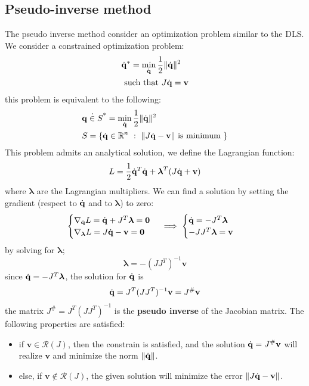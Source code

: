 \documentclass[10pt, letterpaper]{report}
\begin{document}
\subsection{Pseudo-inverse method}
The pseudo inverse method consider an optimization problem similar to the DLS. We consider a constrained optimization problem:\begin{align}
    &\dot{\mathbf q}^*=\min_{\dot{\mathbf q}}\frac{1}{2}\|{\dot{\mathbf q}}\|^2\\
    &\text{ such that }J{\dot{\mathbf q}}=\mathbf v 
\end{align}
this problem is equivalent to the following:
\begin{align}
    &\dot{\mathbf q\in S}^*=\min_{\dot{\mathbf q}}\frac{1}{2}\|{\dot{\mathbf q}}\|^2\\
    &S=\{{\dot{\mathbf q}}\in {\mathbb R}^n \ : \ \|J{\dot{\mathbf q}}-\mathbf v \| \text{ is minimum }\}
\end{align}
This problem admits an analytical solution, we define the Lagrangian function:\begin{equation}
    L=\frac{1}{2}{\dot{\mathbf q}}^T{\dot{\mathbf q}}+\boldsymbol{\lambda}^T(J{\dot{\mathbf q}}+\mathbf v)
\end{equation}
where $\boldsymbol{\lambda}$ are the Lagrangian multipliers. We can find a solution by setting the gradient (respect to ${\dot{\mathbf q}}$ and to $\boldsymbol{\lambda}$) to zero:\begin{equation}
    \begin{cases}
        \nabla_{\dot{\mathbf q}} L={\dot{\mathbf q}}+J^T\boldsymbol{\lambda}=\mathbf 0\\ 
        \nabla_{\boldsymbol{\lambda}} L=J{\dot{\mathbf q}}-\mathbf v=\mathbf 0
    \end{cases}\implies \begin{cases}
        {\dot{\mathbf q}} = -J^T\boldsymbol{\lambda}\\ 
        -JJ^T\boldsymbol{\lambda}=\mathbf v
    \end{cases}
\end{equation}
by solving for $\boldsymbol{\lambda}$;\begin{equation}
    \boldsymbol{\lambda}=-(JJ^T)^{-1}\mathbf v 
\end{equation}
since ${\dot{\mathbf q}} = -J^T\boldsymbol{\lambda}$, the solution for ${\dot{\mathbf q}}$ is\begin{equation}
    {\dot{\mathbf q}} = J^T(JJ^T)^{-1}\mathbf v = J^\#\mathbf v
\end{equation}
the matrix $J^\#=J^T(JJ^T)^{-1}$ is the \textbf{pseudo inverse} of the Jacobian matrix. The following properties are satisfied:\begin{itemize}
    \item if $\mathbf v\in \mathcal R(J)$, then the constrain is satisfied, and the solution ${\dot{\mathbf q}}=J^\#\mathbf v$ will realize $\mathbf v$ and minimize the norm $\|{\dot{\mathbf q}}\|$. 
    \item else, if $\mathbf v\notin \mathcal R(J)$, the given solution will minimize the error $\|J{\dot{\mathbf q}}-\mathbf v\|$.
\end{itemize}
\end{document}
